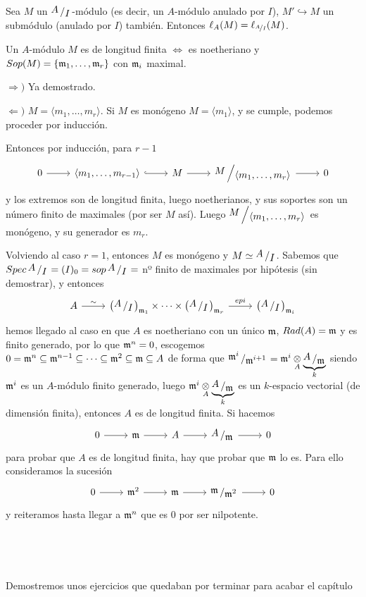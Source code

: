 Sea $M$ un $\modulo{A}{I}$-m\'odulo (es decir, un $A$-m\'odulo anulado por $I$), $M' \hookrightarrow M$ un subm\'odulo (anulado por $I$) tambi\'en. Entonces $\ell_A(M) = \ell_{\nicefrac{A}{I}}(M)$. 
\begin{teo}
    Un $A$-m\'odulo $M$ es de longitud finita $\iff$ es noetheriano y $Sop(M) = \{\mathfrak{m}_1, \ldots, \mathfrak{m}_r\}$ con $\mathfrak{m}_i$ maximal.
\end{teo}
\begin{dem}
    $\Rightarrow)$ Ya demostrado.

    $\Leftarrow)$ $M = \langle m_1, \ldots, m_r\rangle$. Si $M$ es mon\'ogeno $M=\langle m_1 \rangle$, y se cumple, podemos proceder por inducci\'on. 

    Entonces por inducci\'on, para $r-1$
    $$\bt 0 \rar &  \langle m_1, \ldots, m_{r-1} \rangle \rar[hook] & M\rar & \modulo{M}{\langle m_1, \ldots, m_r\rangle} \rar & 0 \et$$
    y los extremos son de longitud finita, luego noetherianos, y sus soportes son un n\'umero finito de maximales (por ser $M$ as\'i). Luego $\modulo{M}{\langle m_1, \ldots, m_r\rangle}$ es mon\'ogeno, y su generador es $m_r$. 

    Volviendo al caso $r=1$, entonces $M$ es mon\'ogeno y $M\simeq \modulo{A}{I}$. Sabemos que $Spec\, \modulo{A}{I} = (I)_0 = sop \, \modulo{A}{I} =$ nº finito de maximales por hip\'otesis (sin demostrar), y entonces
    $$\bt A\rar{\sim} & \left(\modulo{A}{I}\right)_{\m_1} \times \cdots \times \left(\modulo{A}{I}\right)_{\m_r} \rar{epi} & \left(\modulo{A}{I}\right)_{\m_i}  \et$$
    hemos llegado al caso en que $A$ es noetheriano con un \'unico $\mathfrak{m}$, $Rad(A) = \mathfrak{m}$ y es finito generado, por lo que $\mathfrak{m}^n=0$, escogemos $0 = \mathfrak{m}^n \subseteq \mathfrak{m}^{n-1}\subseteq \cdots \subseteq \mathfrak{m}^2 \subseteq \mathfrak{m} \subseteq A$ de forma que 
    $\modulo{\m^i}{\m^{i+1}} = \m^i \underset{A}{\otimes}\underbrace{\modulo{A}{\m}}_k$ siendo $\mathfrak{m}^i$ es un $A$-m\'odulo finito generado, luego $ \m^i \underset{A}{\otimes}\underbrace{\modulo{A}{\m}}_k$ es un $k$-espacio vectorial (de dimensi\'on finita), entonces $A$ es de longitud finita. Si hacemos 
    $$\bt 0 \rar & \m \rar & A \rar & \modulo{A}{\m} \rar & 0\et$$
    para probar que $A$ es de longitud finita, hay que probar que $\mathfrak{m}$ lo es. Para ello consideramos la sucesi\'on
    $$\bt 0 \rar & \m^2 \rar & \m \rar & \modulo{\m}{\m^2} \rar & 0\et$$
    y reiteramos hasta llegar a $\mathfrak{m}^n$ que es 0 por ser nilpotente.
\end{dem}
\, 

\,

Demostremos unos ejercicios que quedaban por terminar para acabar el capítulo


